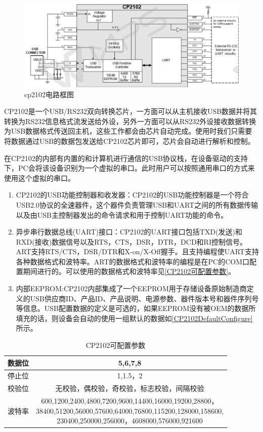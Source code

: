\begin{figure}[!h]
\centering
\includegraphics[width=1.0\textwidth]{./graphics/cp2102-circuit-diagram.pdf}
\caption{cp2102电路框图}\label{fig:cp2102电路框图}
\end{figure}

	CP2102是一个USB/RS232双向转换芯片，一方面可以从主机接收USB数据并将其转换为RS232信息格式流发送给外设，另外一方面可以从RS232外设接收数据转换为USB数据格式传送回主机，这些工作都会由芯片自动完成。使用时我们只需要将数据通过USB的数据包发送给CP2102芯片即可，芯片会自动进行解析和控制。
	
	在CP2102的内部有内置的和计算机进行通信的USB协议栈，在设备驱动的支持下，PC会将该设备识别为一个虚拟的串口。此时用户可以按照通用串口的方式来使用这个虚拟的串口。	
\begin{enumerate}
\item CP2102的USB功能控制器和收发器：CP2102的USB功能控制器是一个符合USB2.0协议的全速器件，这个器件负责管理USB和UART之间的所有数据传输以及由USB主控制器发出的命令请求和用于控制UART功能的命令。
\item 异步串行数据总线(UART)接口：CP2102的UART接口包括TXD(发送)和RXD(接收)数据信号以及RTS，CTS，DSR，DTR，DCD和RI控制信号。ART支持RTS/CTS，DSR/DTR和X-on/X-Off握手。且支持编程使UART支持各种数据格式和波特率。ART的数据格式和波特率的编程是在PC的COM口配置期间进行的。可以使用的数据格式和波特率见\autoref{CP2102可配置参数}。
\item 内部EEPROM:CP2102内部集成了一个EEPROM用于存储设备原始制造商定义的USB供应商ID、产品ID、产品说明、电源参数、器件版本号和器件序列号等信息\cite{CP2102}。USB配置数据的定义是可选的，如果EEPROM没有被OEM的数据所填充的话，则设备会自动的使用一组默认的数据如\autoref{CP2102DefaultConfigure}所示。
\end{enumerate}


\begin{table}[!h]
\centering
\begin{tabular}{|c|c|}
\hline
{数据位} & {5,6,7,8} \\
\hline
{停止位} & {1,1.5，2} \\
\hline
{校验位} & {无校验，偶校验，奇校验，标志校验，间隔校验} \\
\hline
{波特率} & \tabincell{c}{600,1200,2400,4800,7200,9600,14400,16000,19200,28800，\\ 38400,51200,56000,57600,64000,76800,115200,128000,158600,\\ 230400,250000,256000，4608000,576000,921600}\\
\hline
\end{tabular} 
\caption{CP2102可配置参数}\label{CP2102可配置参数}
\end{table}

